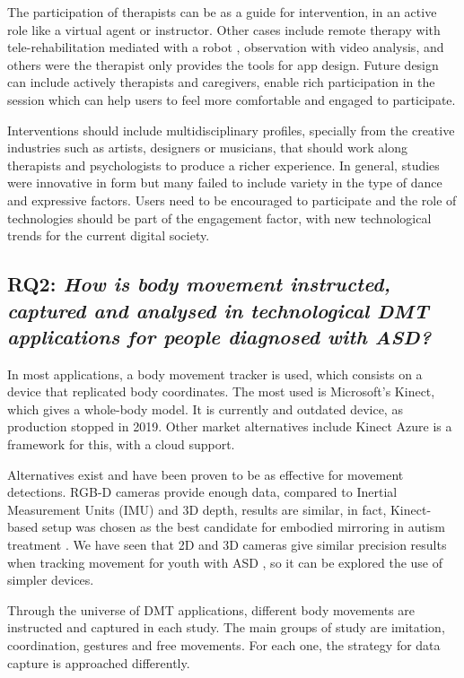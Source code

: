 \documentclass[a4paper,fleqn]{cas-sc}
\begin{document}
The participation of therapists can be as a guide for intervention, in an active role like a virtual agent or instructor. Other cases include remote therapy with tele-rehabilitation mediated with a robot \cite{Rosly20}, observation with video analysis, and others were the therapist only provides the tools for app design. Future design can include actively therapists and caregivers, enable rich participation in the session which can help users to feel more comfortable and engaged to participate.

Interventions should include multidisciplinary profiles, specially from the creative industries such as artists, designers or musicians, that should work along therapists and psychologists to produce a richer experience. In general, studies were innovative in form but many failed to include variety in the type of dance and expressive factors. Users need to be encouraged to participate and the role of technologies should be part of the engagement factor, with new technological trends for the current digital society.


\subsection{RQ2: \emph{How is body movement instructed, captured and analysed in technological DMT applications for people diagnosed with ASD? }} 

In most applications, a body movement tracker is used, which consists on a device that replicated body coordinates. The most used is Microsoft’s Kinect, which gives a whole-body model.  It is currently and outdated device, as production stopped in 2019. Other market alternatives include  Kinect Azure is a framework for this, with a cloud support.

Alternatives exist and have been proven to be as effective for movement detections. RGB-D cameras provide enough data, compared to Inertial Measurement Units (IMU) and 3D depth, results are similar, in fact, Kinect-based setup was chosen as the best candidate for embodied mirroring in autism treatment \cite{Geminiani19}. We have seen that 2D and 3D cameras give similar precision results when tracking movement for youth with ASD \cite{Zampella21}, so it can be explored the use of simpler devices.

Through the universe of DMT applications, different body movements are instructed and captured in each study. The main groups of study are imitation, coordination, gestures and free movements. For each one, the strategy for data capture is approached differently.
\end{document}
